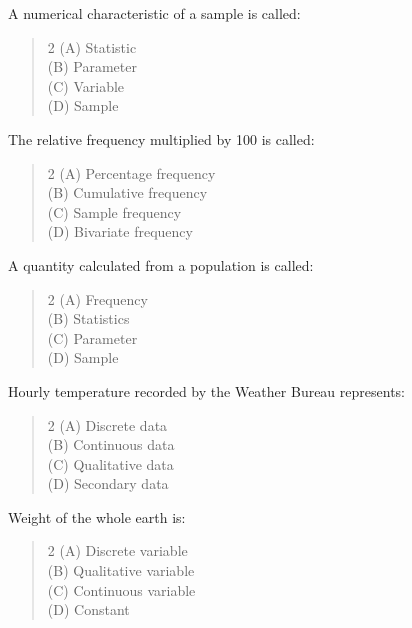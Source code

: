 \documentclass[11pt,a4paper]{article}
\begin{document}
\begin{mcqlist}
\item A numerical characteristic of a sample is called:
\begin{quote}\begin{multicols}{2}
\noindent (A) Statistic \\
(B) Parameter \\
(C) Variable \\
(D) Sample
\end{multicols}\end{quote}

\item The relative frequency multiplied by 100 is called:
\begin{quote}\begin{multicols}{2}
\noindent (A) Percentage frequency \\
(B) Cumulative frequency \\
(C) Sample frequency \\
(D) Bivariate frequency
\end{multicols}\end{quote}

\item A quantity calculated from a population is called:
\begin{quote}\begin{multicols}{2}
\noindent (A) Frequency \\
(B) Statistics \\
(C) Parameter \\
(D) Sample
\end{multicols}\end{quote}

\item Hourly temperature recorded by the Weather Bureau represents:
\begin{quote}\begin{multicols}{2}
\noindent (A) Discrete data \\
(B) Continuous data \\
(C) Qualitative data \\
(D) Secondary data
\end{multicols}\end{quote}

\item Weight of the whole earth is:
\begin{quote}\begin{multicols}{2}
\noindent (A) Discrete variable \\
(B) Qualitative variable \\
(C) Continuous variable \\
(D) Constant
\end{multicols}\end{quote}


\end{mcqlist}
\end{document}
